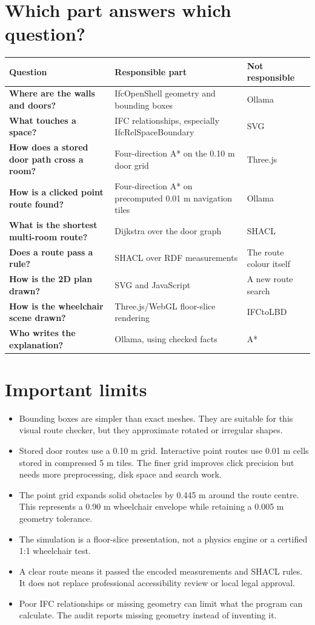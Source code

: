 \documentclass[11pt,a4paper]{article}
\begin{document}
\section{Which part answers which question?}
\begin{tabularx}{\textwidth}{>{\bfseries}p{35mm}X X}
\toprule
Question & Responsible part & Not responsible \\
\midrule
Where are the walls and doors? & IfcOpenShell geometry and bounding boxes & Ollama \\
What touches a space? & IFC relationships, especially IfcRelSpaceBoundary & SVG \\
How does a stored door path cross a room? & Four-direction A* on the 0.10 m door grid & Three.js \\
How is a clicked point route found? & Four-direction A* on precomputed 0.01 m navigation tiles & Ollama \\
What is the shortest multi-room route? & Dijkstra over the door graph & SHACL \\
Does a route pass a rule? & SHACL over RDF measurements & The route colour itself \\
How is the 2D plan drawn? & SVG and JavaScript & A new route search \\
How is the wheelchair scene drawn? & Three.js/WebGL floor-slice rendering & IFCtoLBD \\
Who writes the explanation? & Ollama, using checked facts & A* \\
\bottomrule
\end{tabularx}

\section{Important limits}
\begin{itemize}
\item Bounding boxes are simpler than exact meshes. They are suitable for this visual route checker, but they approximate rotated or irregular shapes.
\item Stored door routes use a 0.10 m grid. Interactive point routes use 0.01 m cells stored in compressed 5 m tiles. The finer grid improves click precision but needs more preprocessing, disk space and search work.
\item The point grid expands solid obstacles by 0.445 m around the route centre. This represents a 0.90 m wheelchair envelope while retaining a 0.005 m geometry tolerance.
\item The simulation is a floor-slice presentation, not a physics engine or a certified 1:1 wheelchair test.
\item A clear route means it passed the encoded measurements and SHACL rules. It does not replace professional accessibility review or local legal approval.
\item Poor IFC relationships or missing geometry can limit what the program can calculate. The audit reports missing geometry instead of inventing it.
\end{itemize}
\end{document}
